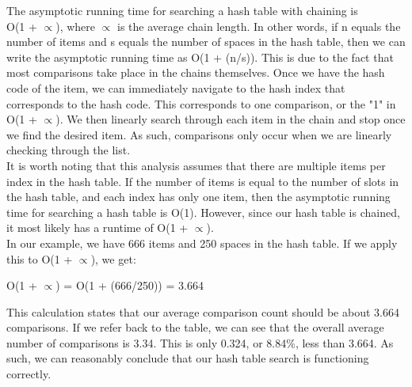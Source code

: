 \documentclass{article}
\begin{document}
The asymptotic running time for searching a hash table with chaining is \\ O(1 + $\propto$), where $\propto$ is the average chain length. In other words, if n equals the number of items and s equals the number of spaces in the hash table, then we can write the asymptotic running time as O(1 + (n/s)). This is due to the fact that most comparisons take place in the chains themselves. Once we have the hash code of the item, we can immediately navigate to the hash index that corresponds to the hash code. This corresponds to one comparison, or the "1" in O(1 + $\propto$). We then linearly search through each item in the chain and stop once we find the desired item. As such, comparisons only occur when we are linearly checking through the list. \\
It is worth noting that this analysis assumes that there are multiple items per index in the hash table. If the number of items is equal to the number of slots in the hash table, and each index has only one item, then the asymptotic running time for searching a hash table is O(1). However, since our hash table is chained, it most likely has a runtime of O(1 + $\propto$). \\
In our example, we have 666 items and 250 spaces in the hash table. If we apply this to O(1 + $\propto$), we get:
\begin{center}
    O(1 + $\propto$) = O(1 + (666/250)) = 3.664
\end{center}
This calculation states that our average comparison count should be about 3.664 comparisons. If we refer back to the table, we can see that the overall average number of comparisons is 3.34. This is only 0.324, or 8.84\%, less than 3.664. As such, we can reasonably conclude that our hash table search is functioning correctly. 
\end{document}
